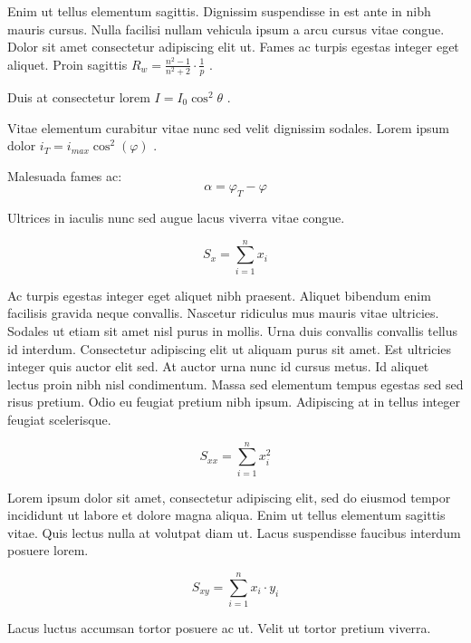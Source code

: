 \documentclass{article}
\begin{document}
Enim ut tellus elementum sagittis. Dignissim suspendisse in est ante in nibh mauris cursus. Nulla facilisi nullam vehicula ipsum a arcu cursus vitae congue. Dolor sit amet consectetur adipiscing elit ut. Fames ac turpis egestas integer eget aliquet. Proin sagittis
 \begin{math}
	R_w=\frac{n^2-1}{n^2+2} \cdot \frac{1}{p}
\end{math}
.\newline

Duis at consectetur lorem
 $ I=I_0\cos ^2\theta $
 .\newline

Vitae elementum curabitur vitae nunc sed velit dignissim sodales. Lorem ipsum dolor 
\( i_T=i_{max}\cos ^2(\varphi) \)
.\newline

Malesuada fames ac: 
\[ \alpha=\varphi_T-\varphi \]

Ultrices in iaculis nunc sed augue lacus viverra vitae congue.

$$ S_x=\sum_{i=1}^{n}x_i $$

Ac turpis egestas integer eget aliquet nibh praesent. Aliquet bibendum enim facilisis gravida neque convallis. Nascetur ridiculus mus mauris vitae ultricies. Sodales ut etiam sit amet nisl purus in mollis. Urna duis convallis convallis tellus id interdum. Consectetur adipiscing elit ut aliquam purus sit amet. Est ultricies integer quis auctor elit sed. At auctor urna nunc id cursus metus. Id aliquet lectus proin nibh nisl condimentum. Massa sed elementum tempus egestas sed sed risus pretium. Odio eu feugiat pretium nibh ipsum. Adipiscing at in tellus integer feugiat scelerisque.

\begin{displaymath}
	S_{xx}=\sum_{i=1}^{n}x_i^2
\end{displaymath}

Lorem ipsum dolor sit amet, consectetur adipiscing elit, sed do eiusmod tempor incididunt ut labore et dolore magna aliqua. Enim ut tellus elementum sagittis vitae. Quis lectus nulla at volutpat diam ut. Lacus suspendisse faucibus interdum posuere lorem. 

\begin{equation}
	S_{xy}=\sum_{i=1}^{n}x_i\cdot y_i
\end{equation}

Lacus luctus accumsan tortor posuere ac ut. Velit ut tortor pretium viverra.
\end{document}
